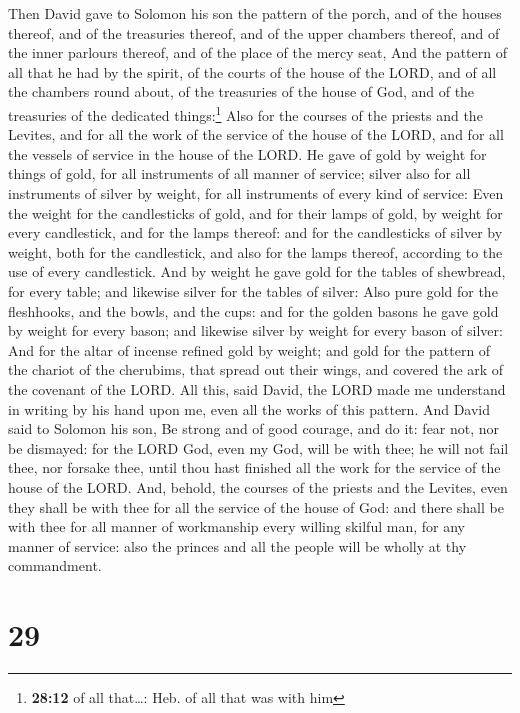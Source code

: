  Then David gave to Solomon his son the pattern of the
porch, and of the houses thereof, and of the treasuries thereof, and of
the upper chambers thereof, and of the inner parlours thereof, and of
the place of the mercy seat,  And the pattern of all that
he had by the spirit, of the courts of the house of the LORD, and of all
the chambers round about, of the treasuries of the house of God, and of
the treasuries of the dedicated things:\footnote{\textbf{28:12} of all
  that\ldots: Heb. of all that was with him}  Also for
the courses of the priests and the Levites, and for all the work of the
service of the house of the LORD, and for all the vessels of service in
the house of the LORD.  He gave of gold by weight for
things of gold, for all instruments of all manner of service; silver
also for all instruments of silver by weight, for all instruments of
every kind of service:  Even the weight for the
candlesticks of gold, and for their lamps of gold, by weight for every
candlestick, and for the lamps thereof: and for the candlesticks of
silver by weight, both for the candlestick, and also for the lamps
thereof, according to the use of every candlestick.  And
by weight he gave gold for the tables of shewbread, for every table; and
likewise silver for the tables of silver:  Also pure gold
for the fleshhooks, and the bowls, and the cups: and for the golden
basons he gave gold by weight for every bason; and likewise silver by
weight for every bason of silver:  And for the altar of
incense refined gold by weight; and gold for the pattern of the chariot
of the cherubims, that spread out their wings, and covered the ark of
the covenant of the LORD.  All this, said David, the LORD
made me understand in writing by his hand upon me, even all the works of
this pattern.  And David said to Solomon his son, Be
strong and of good courage, and do it: fear not, nor be dismayed: for
the LORD God, even my God, will be with thee; he will not fail thee, nor
forsake thee, until thou hast finished all the work for the service of
the house of the LORD.  And, behold, the courses of the
priests and the Levites, even they shall be with thee for all the
service of the house of God: and there shall be with thee for all manner
of workmanship every willing skilful man, for any manner of service:
also the princes and all the people will be wholly at thy commandment.

\hypertarget{section-28}{%
\section{29}\label{section-28}}

